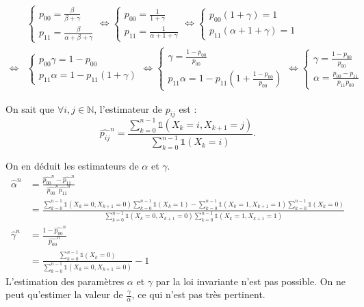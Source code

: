 \documentclass[12pt,a4paper]{report}
\theoremstyle{remark}
\begin{document}
\begin{align*}
&\left\{
\begin{array}{ll}
        p_{00} = \frac{\beta}{\beta+\gamma} \\
        p_{11} = \frac{\beta}{\alpha+\beta+\gamma} 
    \end{array}
\right.
\iff\left\{
\begin{array}{ll}
          p_{00} = \frac{1}{1+\gamma} \\
        p_{11} = \frac{1}{\alpha+1+\gamma}
    \end{array}
\right.
\iff \left\{
\begin{array}{ll}
         p_{00}(1+\gamma)= 1 \\
        p_{11}(\alpha + 1 +\gamma) =1  \end{array}
\right.\\
\iff &\left\{
\begin{array}{ll}
          p_{00}\gamma= 1-p_{00} \\
        p_{11}\alpha = 1 - p_{11}(1+\gamma)   \end{array}
    \right.
\iff \left\{
\begin{array}{ll}
        \gamma= \frac{1-p_{00}}{p_{00}} \\
       p_{11}\alpha = 1 - p_{11}(1+\frac{1-p_{00}}{p_{00}})  
       \end{array}  
    \right.   
\iff \left\{
\begin{array}{ll}
         \gamma= \frac{1-p_{00}}{p_{00}} \\
        \alpha = \frac{p_{00}-p_{11}}{p_{11}p_{00}}   
    \end{array}    
    \right.      
\end{align*}


On sait que $\forall i,j \in \mathbb{N}$, l'estimateur de $p_{ij}$ est  : 
$$\hat{p_{ij}}^n = \frac{\sum\limits_{k=0}^{n-1} \mathds{1}(X_k=i, X_{k+1}=j)}{\sum\limits_{k=0}^{n-1} \mathds{1}(X_k=i)}.$$

On en déduit les estimateurs de $\alpha$ et $\gamma$.
\begin{align*}
\hat{\alpha}^n &= \frac{\hat{p_{00}}^n-\hat{p_{11}}^n}{\hat{p_{00}}^n\hat{p_{11}}^n} \\
&= \frac{\sum\limits_{k=0}^{n-1} \mathds{1}(X_k=0, X_{k+1}=0)\sum\limits_{k=0}^{n-1} \mathds{1}(X_k=1)-\sum\limits_{k=0}^{n-1} \mathds{1}(X_k=1, X_{k+1}=1)\sum\limits_{k=0}^{n-1} \mathds{1}(X_k=0)}{\sum\limits_{k=0}^{n-1} \mathds{1}(X_k=0, X_{k+1}=0)\sum\limits_{k=0}^{n-1} \mathds{1}(X_k=1, X_{k+1}=1)}\\
\hat{\gamma}^n &= \frac{1- \hat{p_{00}}^n}{\hat{p_{00}}^n} \\
&= \frac{{\sum\limits_{k=0}^{n-1} \mathds{1}(X_k=0)}}{{\sum\limits_{k=0}^{n-1} \mathds{1}(X_k=0,X_{k+1}=0)}} - 1
\end{align*}
L'estimation des paramètres $\alpha$  et $\gamma$ par la loi invariante n'est pas possible. On ne peut qu'estimer la valeur de $\frac{\gamma}{\alpha}$, ce qui n'est pas très pertinent.
\vspace{0.5cm}
\end{document}
